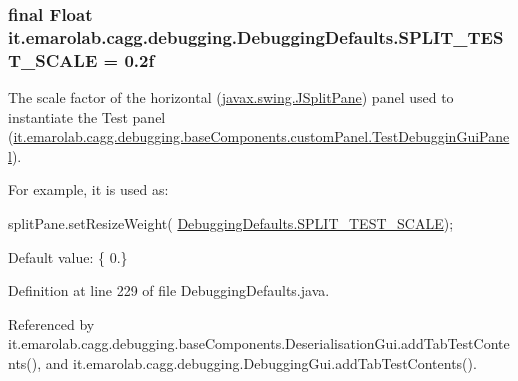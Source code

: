 \hypertarget{classit_1_1emarolab_1_1cagg_1_1debugging_1_1DebuggingDefaults_ae1479cc72b04e9e455ec26a92c378a28}{
\subsubsection[{S\-P\-L\-I\-T\-\_\-\-T\-E\-S\-T\-\_\-\-S\-C\-A\-L\-E}]{\setlength{\rightskip}{0pt plus 5cm}final Float it.\-emarolab.\-cagg.\-debugging.\-Debugging\-Defaults.\-S\-P\-L\-I\-T\-\_\-\-T\-E\-S\-T\-\_\-\-S\-C\-A\-L\-E = 0.\-2f\hspace{0.3cm}{\ttfamily [static]}}}\label{classit_1_1emarolab_1_1cagg_1_1debugging_1_1DebuggingDefaults_ae1479cc72b04e9e455ec26a92c378a28}
The scale factor of the horizontal (\hyperlink{}{javax.\-swing.\-J\-Split\-Pane}) panel used to instantiate the Test panel (\hyperlink{classit_1_1emarolab_1_1cagg_1_1debugging_1_1baseComponents_1_1customPanel_1_1TestDebugginGuiPanel}{it.\-emarolab.\-cagg.\-debugging.\-base\-Components.\-custom\-Panel.\-Test\-Debuggin\-Gui\-Panel}).\par
 For example, it is used as\-:
\begin{DoxyCode}
splitPane.setResizeWeight( \hyperlink{classit_1_1emarolab_1_1cagg_1_1debugging_1_1DebuggingDefaults_ae1479cc72b04e9e455ec26a92c378a28}{DebuggingDefaults.SPLIT\_TEST\_SCALE}); 
\end{DoxyCode}
 \par
 Default value\-: \{ 0.\} 

Definition at line 229 of file Debugging\-Defaults.\-java.



Referenced by it.\-emarolab.\-cagg.\-debugging.\-base\-Components.\-Deserialisation\-Gui.\-add\-Tab\-Test\-Contents(), and it.\-emarolab.\-cagg.\-debugging.\-Debugging\-Gui.\-add\-Tab\-Test\-Contents().

